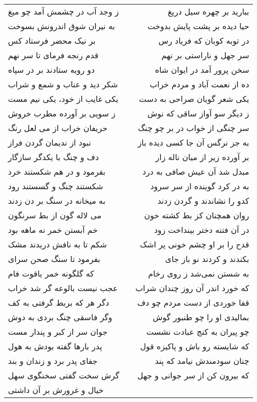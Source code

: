 \begin{center}
\begin{longtable}{l p{0.5cm} r}
ز وجد آب در چشمش آمد چو میغ
&&
ببارید بر چهره سیل دریغ
\\
به نیران شوق اندرونش بسوخت
&&
حیا دیده بر پشت پایش بدوخت
\\
بر نیک محضر فرستاد کس
&&
در توبه کوبان که فریاد رس
\\
قدم رنجه فرمای تا سر نهم
&&
سر جهل و ناراستی بر نهم
\\
دو رویه ستادند بر در سپاه
&&
سخن پرور آمد در ایوان شاه
\\
شکر دید و عناب و شمع و شراب
&&
ده از نعمت آباد و مردم خراب
\\
یکی غایب از خود، یکی نیم مست
&&
یکی شعر گویان صراحی به دست
\\
ز سویی بر آورده مطرب خروش
&&
ز دیگر سو آواز ساقی که نوش
\\
حریفان خراب از می لعل رنگ
&&
سر چنگی از خواب در بر چو چنگ
\\
نبود از ندیمان گردن فراز
&&
به جز نرگس آن جا کسی دیده باز
\\
دف و چنگ با یکدگر سازگار
&&
بر آورده زیر از میان ناله زار
\\
بفرمود و در هم شکستند خرد
&&
مبدل شد آن عیش صافی به درد
\\
شکستند چنگ و گسستند رود
&&
به در کرد گوینده از سر سرود
\\
به میخانه در سنگ بر دن زدند
&&
کدو را نشاندند و گردن زدند
\\
می لاله گون از بط سرنگون
&&
روان همچنان کز بط کشته خون
\\
خم آبستن خمر نه ماهه بود
&&
در آن فتنه دختر بینداخت زود
\\
شکم تا به نافش دریدند مشک
&&
قدح را بر او چشم خونی پر اشک
\\
بفرمود تا سنگ صحن سرای
&&
بکندند و کردند نو باز جای
\\
که گلگونه خمر یاقوت فام
&&
به شستن نمی‌شد ز روی رخام
\\
عجب نیست بالوعه گر شد خراب
&&
که خورد اندر آن روز چندان شراب
\\
دگر هر که بربط گرفتی به کف
&&
قفا خوردی از دست مردم چو دف
\\
وگر فاسقی چنگ بردی به دوش
&&
بمالیدی او را چو طنبور گوش
\\
جوان سر از کبر و پندار مست
&&
چو پیران به کنج عبادت نشست
\\
پدر بارها گفته بودش به هول
&&
که شایسته رو باش و پاکیزه قول
\\
جفای پدر برد و زندان و بند
&&
چنان سودمندش نیامد که پند
\\
گرش سخت گفتی سخنگوی سهل
&&
که بیرون کن از سر جوانی و جهل
\\
خیال و غرورش بر آن داشتی

\end{longtable}
\end{center}
